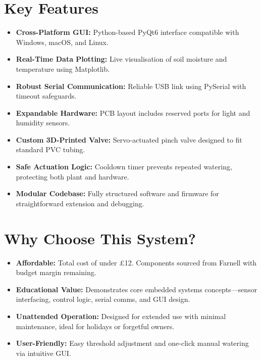 \documentclass[a4paper,11pt]{article}
\begin{document}
\vspace{1em}

\section*{Key Features}
\begin{itemize}[leftmargin=1.5em]
    \item \textbf{Cross-Platform GUI:} 
    Python-based PyQt6 interface compatible with Windows, macOS, and Linux.
    \item \textbf{Real-Time Data Plotting:} 
    Live visualisation of soil moisture and temperature using Matplotlib.
    \item \textbf{Robust Serial Communication:} 
    Reliable USB link using PySerial with timeout safeguards.
    \item \textbf{Expandable Hardware:} 
    PCB layout includes reserved ports for light and humidity sensors.
    \item \textbf{Custom 3D-Printed Valve:} 
    Servo-actuated pinch valve designed to fit standard PVC tubing.
    \item \textbf{Safe Actuation Logic:} 
    Cooldown timer prevents repeated watering, protecting both plant and hardware.
    \item \textbf{Modular Codebase:} 
    Fully structured software and firmware for 
    straightforward extension and debugging.
\end{itemize}

\section*{Why Choose This System?}
\begin{itemize}[leftmargin=1.5em]
    \item \textbf{Affordable:} 
    Total cost of under £12. Components sourced from Farnell with budget margin remaining.
    \item \textbf{Educational Value:} 
    Demonstrates core embedded systems concepts—sensor interfacing, 
    control logic, serial comms, and GUI design.
    \item \textbf{Unattended Operation:} Designed for extended use with 
    minimal maintenance, ideal for holidays or forgetful owners.
    \item \textbf{User-Friendly:} Easy threshold adjustment and 
    one-click manual watering via intuitive GUI.
\end{itemize}
\end{document}
